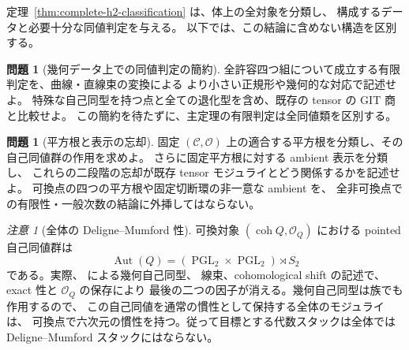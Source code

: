 \documentclass[a4paper,11pt]{ltjsarticle}
\numberwithin{equation}{section}
\theoremstyle{plain}
\theoremstyle{definition}
\newtheorem{problem}[theorem]{問題}
\theoremstyle{remark}
\newtheorem{remark}[theorem]{注意}
\newcommand{\OO}{\mathcal O}
\newcommand{\cC}{\mathcal C}
\DeclareMathOperator{\coh}{coh}
\begin{document}
定理~\ref{thm:complete-h2-classification} は、体上の全対象を分類し、
構成するデータと必要十分な同値判定を与える。
以下では、この結論に含めない構造を区別する。

\begin{problem}[幾何データ上での同値判定の簡約]
全許容四つ組について成立する有限判定を、曲線・直線束の変換による
より小さい正規形や幾何的な対応で記述せよ。
特殊な自己同型を持つ点と全ての退化型を含め、既存の tensor の GIT 商と比較せよ。
この簡約を待たずに、主定理の有限判定は全同値類を区別する。
\end{problem}

\begin{problem}[平方根と表示の忘却]
固定 $(\cC,\OO)$ 上の適合する平方根を分類し、その自己同値群の作用を求めよ。
さらに固定平方根に対する ambient 表示を分類し、
これらの二段階の忘却が既存 tensor モジュライとどう関係するかを記述せよ。
可換点の四つの平方根や固定切断環の非一意な ambient を、
全非可換点での有限性・一般次数の結論に外挿してはならない。
\end{problem}

\begin{remark}[全体の Deligne--Mumford 性]
可換対象 $(\coh Q,\mathcal O_Q)$ における pointed 自己同値群は
\[
 \operatorname{Aut}(Q)=(\operatorname{PGL}_2\times\operatorname{PGL}_2)\rtimes S_2
\]
である。実際、\cite[Theorem 3.1]{BondalOrlov2001} による幾何自己同型、
線束、cohomological shift の記述で、exact 性と $\mathcal O_Q$ の保存により
最後の二つの因子が消える。幾何自己同型は族でも作用するので、
この自己同値を通常の慣性として保持する全体のモジュライは、
可換点で六次元の慣性を持つ。従って目標とする代数スタックは全体では
Deligne--Mumford スタックにはならない。
\end{remark}
\end{document}
